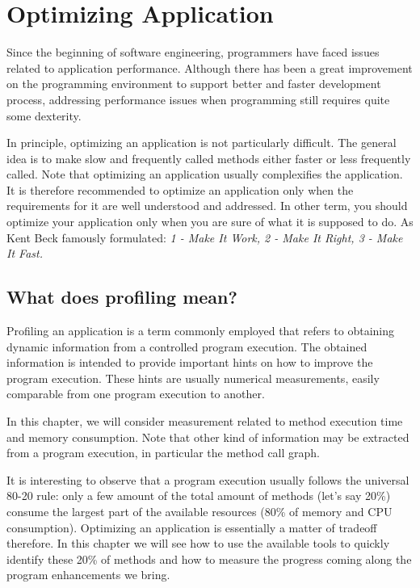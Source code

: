 \documentclass[a4paper,10pt,twoside]{book}
\begin{document}


\chapter{Optimizing Application}

Since the beginning of software engineering, programmers have faced issues related to application performance. Although there has been a great improvement on the programming environment to support better and faster development process, addressing performance issues when programming still requires quite some dexterity.

In principle, optimizing an application is not particularly difficult. The general idea is to make slow and frequently called methods either faster or less frequently called. Note that optimizing an application usually complexifies the application. It is therefore recommended to optimize an application only when the requirements for it are well understood and addressed. In other term, you should optimize your application only when you are sure of what it is supposed to do. As Kent Beck famously formulated: \emph{1 - Make It Work, 2 - Make It Right, 3 - Make It Fast.}

\section{What does profiling mean?} 
Profiling an application is a term commonly employed that refers to obtaining dynamic information from a controlled program execution. The obtained information is intended to provide important hints on how to improve the program execution. These hints are usually numerical measurements, easily comparable from one program execution to another.

In this chapter, we will consider measurement related to method execution time and memory consumption. Note that other kind of information may be extracted from a program execution, in particular the method call graph.

It is interesting to observe that a program execution usually follows the universal 80-20 rule: only a few amount of the total amount of methods (let's say 20\%) consume the largest part of the available resources (80\% of memory and CPU consumption). Optimizing an application is essentially a matter of tradeoff therefore. In this chapter we will see how to use the available tools to quickly identify these 20\% of methods and how to measure the progress coming along the program enhancements we bring.
\end{document}
